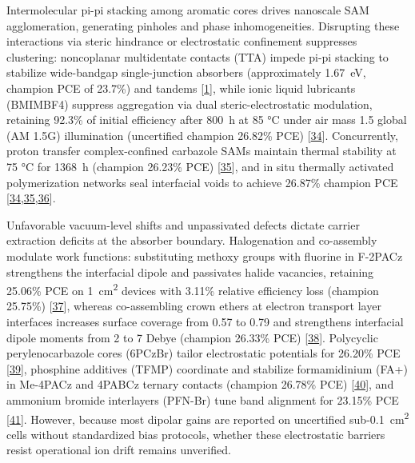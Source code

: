 \documentclass[
  11pt,
]{article}
\begin{document}
Intermolecular pi-pi stacking among aromatic cores drives nanoscale SAM
agglomeration, generating pinholes and phase inhomogeneities. Disrupting
these interactions via steric hindrance or electrostatic confinement
suppresses clustering: noncoplanar multidentate contacts (TTA) impede
pi-pi stacking to stabilize wide-bandgap single-junction absorbers
(approximately \qty{1.67}{\electronvolt}, champion PCE of 23.7\%) and
tandems {[}\href{https://doi.org/10.1126/sciadv.aei2945}{1}{]}, while
ionic liquid lubricants (BMIMBF4) suppress aggregation via dual
steric-electrostatic modulation, retaining 92.3\% of initial efficiency
after \qty{800}{\hour} at 85 °C under air mass 1.5 global (AM 1.5G)
illumination (uncertified champion 26.82\% PCE)
{[}\href{https://doi.org/10.1002/anie.7090517}{34}{]}. Concurrently,
proton transfer complex-confined carbazole SAMs maintain thermal
stability at 75 °C for \qty{1368}{\hour} (champion 26.23\% PCE)
{[}\href{https://doi.org/10.1021/acsenergylett.6c01489}{35}{]}, and in
situ thermally activated polymerization networks seal interfacial voids
to achieve 26.87\% champion PCE
{[}\href{https://doi.org/10.1002/anie.7090517}{34},\href{https://doi.org/10.1021/acsenergylett.6c01489}{35},\href{https://doi.org/10.1002/anie.1018855}{36}{]}.

Unfavorable vacuum-level shifts and unpassivated defects dictate carrier
extraction deficits at the absorber boundary. Halogenation and
co-assembly modulate work functions: substituting methoxy groups with
fluorine in F-2PACz strengthens the interfacial dipole and passivates
halide vacancies, retaining 25.06\% PCE on \qty{1}{\centi\meter\squared}
devices with 3.11\% relative efficiency loss (champion 25.75\%)
{[}\href{https://doi.org/10.1002/adfm.76878}{37}{]}, whereas
co-assembling crown ethers at electron transport layer interfaces
increases surface coverage from 0.57 to 0.79 and strengthens interfacial
dipole moments from 2 to 7 Debye (champion 26.33\% PCE)
{[}\href{https://doi.org/10.1002/adma.73886}{38}{]}. Polycyclic
perylenocarbazole cores (6PCzBr) tailor electrostatic potentials for
26.20\% PCE {[}\href{https://doi.org/10.1002/anie.4031162}{39}{]},
phosphine additives (TFMP) coordinate  and stabilize
formamidinium (FA+) in Me-4PACz and 4PABCz ternary contacts (champion
26.78\% PCE) {[}\href{https://doi.org/10.1002/adma.74416}{40}{]}, and
ammonium bromide interlayers (PFN-Br) tune band alignment for 23.15\%
PCE {[}\href{https://doi.org/10.1002/smll.74806}{41}{]}. However,
because most dipolar gains are reported on uncertified
sub-\qty{0.1}{\centi\meter\squared} cells without standardized bias
protocols, whether these electrostatic barriers resist operational ion
drift remains unverified.
\end{document}
